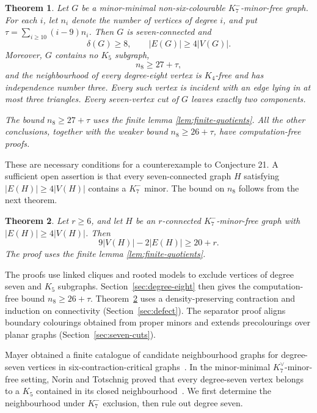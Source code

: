 \documentclass[11pt]{amsart}
\newtheorem{theorem}{Theorem}[section]
\begin{document}
\begin{theorem}\label{thm:main}
Let $G$ be a minor-minimal non-six-colourable $K_7^{-}$-minor-free graph.
For each $i$, let $n_i$ denote the number of vertices of degree $i$, and put
$\tau=\sum_{i\geq10}(i-9)n_i$.
Then $G$ is seven-connected and
\[
        \delta(G)\geq8,
        \qquad |E(G)|\geq4|V(G)|.
\]
Moreover, $G$ contains no $K_5$ subgraph,
\[
        n_8\geq27+\tau,
\]
and the neighbourhood of every degree-eight vertex is $K_4$-free and has
independence number three.  Every such vertex is incident with an edge
lying in at most three triangles.  Every seven-vertex cut of $G$ leaves
exactly two components.

The bound $n_8\geq27+\tau$ uses the finite lemma
\ref{lem:finite-quotients}.  All the other conclusions, together with the
weaker bound $n_8\geq26+\tau$, have computation-free proofs.
\end{theorem}

These are necessary conditions for a counterexample to Conjecture 21.
A sufficient open assertion
is that every seven-connected graph $H$ satisfying
$|E(H)|\geq4|V(H)|$ contains a $K_7^{-}$ minor.  The bound on $n_8$
follows from the next theorem.

\begin{theorem}\label{thm:defect-ladder}
Let $r\geq6$, and let $H$ be an $r$-connected $K_7^{-}$-minor-free graph
with $|E(H)|\geq4|V(H)|$.  Then
\[
                    9|V(H)|-2|E(H)|\geq20+r.
\]
The proof uses the finite lemma \ref{lem:finite-quotients}.
\end{theorem}

The proofs use linked cliques and rooted models to exclude vertices of
degree seven and $K_5$ subgraphs.  Section~\ref{sec:degree-eight} then gives
the computation-free bound $n_8\geq26+\tau$.  Theorem~\ref{thm:defect-ladder}
uses a density-preserving contraction and induction on connectivity
(Section~\ref{sec:defect}).  The separator proof aligns boundary colourings
obtained from proper minors and extends precolourings over planar graphs
(Section~\ref{sec:seven-cuts}).

Mayer obtained a finite catalogue of candidate neighbourhood graphs for
degree-seven vertices in six-contraction-critical graphs~\cite{Mayer1993}.
In the minor-minimal $K_7^{\vee}$-minor-free setting, Norin and Totschnig
proved that every degree-seven vertex belongs to a $K_5$ contained in its
closed neighbourhood~\cite[Claim~4.4]{NorinTotschnig2025}.  We first
determine the neighbourhood under $K_7^{-}$ exclusion, then rule out degree
seven.
\end{document}
